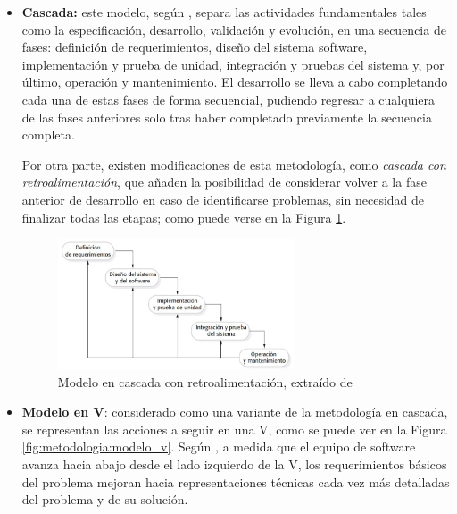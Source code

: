         \begin{itemize}
            \item \textbf{Cascada:} este modelo, según  \cite{sommerville_software_2011}, separa las actividades fundamentales tales como la especificación, desarrollo, validación y evolución, en una secuencia de fases: definición de requerimientos, diseño del sistema software, implementación y prueba de unidad, integración y pruebas del sistema y, por último, operación y mantenimiento. El desarrollo se lleva a cabo completando cada una de estas fases de forma secuencial, pudiendo regresar a cualquiera de las fases anteriores solo tras haber completado previamente la secuencia completa.
        
            Por otra parte, existen modificaciones de esta metodología, como \textit{cascada con retroalimentación}, que añaden la posibilidad de considerar volver a la fase anterior de desarrollo en caso de identificarse problemas, sin necesidad de finalizar todas las etapas; como puede verse en la Figura
            \ref{fig:metodologia:cascada_retroalimentada}.
        
            \begin{figure}[h]
                \centering
                \includegraphics[width=0.66\textwidth]{figures/cascada retroalimentada.JPG}
                \caption[Modelo en cascada con retroalimentación]{Modelo en cascada con retroalimentación, extraído de \cite{sommerville_software_2011}}
                \label{fig:metodologia:cascada_retroalimentada}
            \end{figure}
            
            \item \textbf{Modelo en V}: considerado como una variante de la metodología en cascada, se representan las acciones a seguir en una V, como se puede ver en la Figura \ref{fig:metodologia:modelo_v}. Según \cite{pressman_software_2005}, a medida que el equipo de software avanza hacia abajo desde el lado izquierdo de la V, los requerimientos básicos del problema mejoran hacia representaciones técnicas cada vez más detalladas del problema y de su solución. 
            

\end{itemize}
